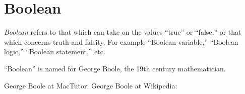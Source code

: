 \documentclass[12pt]{article}
\begin{document}
\section{Boolean}

\emph{Boolean} refers to that which can take on the values ``true'' or ``false,'' or that which concerns truth and falsity.  For example ``Boolean variable,'' ``Boolean logic,'' ``Boolean statement,'' etc.

``Boolean'' is named for George Boole, the 19th century mathematician.

\begin{thebibliography}{3}
 George Boole at MacTutor: 
 George Boole at Wikipedia: 
\end{thebibliography}
\end{document}
